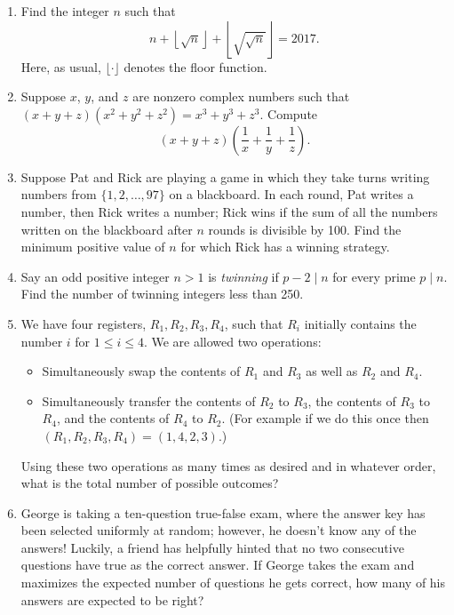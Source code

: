 \documentclass[10pt]{article}
\begin{document}
\begin{enumerate}

\item Find the integer $n$ such that
\[n + \left\lfloor\sqrt{n}\right\rfloor + \left\lfloor\sqrt{\sqrt{n}}\right\rfloor = 2017.\] Here, as usual, $\lfloor\cdot\rfloor$ denotes the floor function.

\item Suppose $x$, $y$, and $z$ are nonzero complex numbers such that $(x+y+z)(x^2+y^2+z^2)=x^3+y^3+z^3$.  Compute \[(x+y+z)\left(\dfrac1x+\dfrac1y+\dfrac1z\right).\]

\item Suppose Pat and Rick are playing a game in which they take turns writing numbers from $\{1, 2, \dots, 97\}$ on a blackboard. In each round, Pat writes a number, then Rick writes a number; Rick wins if the sum of all the numbers written on the blackboard after $n$ rounds is divisible by 100. Find the minimum positive value of $n$ for which Rick has a winning strategy.

\item Say an odd positive integer $n > 1$ is \textit{twinning} if $p - 2 \mid n$ for every prime $p \mid n$. Find the number of twinning integers less than 250.

\item We have four registers, $R_1,R_2,R_3,R_4$, such that $R_i$ initially contains the number $i$ for $1\le i\le4$. We are allowed two operations:

\begin{itemize}
\item Simultaneously swap the contents of $R_1$ and $R_3$ as well as $R_2$ and $R_4$.

\item Simultaneously transfer the contents of $R_2$ to $R_3$, the contents of $R_3$ to $R_4$, and the contents of $R_4$ to $R_2$. (For example if we do this once then $(R_1,R_2,R_3,R_4)=(1,4,2,3)$.)
\end{itemize}

Using these two operations as many times as desired and in whatever order, what is the total number of possible outcomes?

\item George is taking a ten-question true-false exam, where the answer key has been selected uniformly at random; however, he doesn't know any of the answers! Luckily, a friend has helpfully hinted that no two consecutive questions have true as the correct answer. If George takes the exam and maximizes the expected number of questions he gets correct, how many of his answers are expected to be right?


\end{enumerate}
\end{document}
